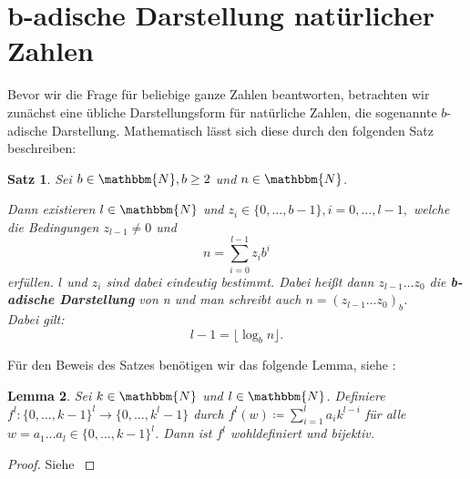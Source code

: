 \documentclass{article}
\newcommand{\N}{\mathbbm{N}} %
\newtheorem{satz}{Satz}
\newtheorem{lemma}[satz]{Lemma}
\begin{document}
\newpage

\section{b-adische Darstellung natürlicher Zahlen}
  Bevor wir die Frage für beliebige ganze Zahlen beantworten, betrachten wir zunächst eine übliche Darstellungsform für natürliche Zahlen, die sogenannte $b$-adische Darstellung.
  Mathematisch lässt sich diese durch den folgenden Satz beschreiben: 

  \begin{satz} \label{satz:b-adische_Darstellung}
    Sei $b\in \N, b \geq 2$ und $n \in \N$. 

    Dann existieren $l \in \N$ und $z_i \in \{0, \dots, b-1\}, {i = 0, \dots, l-1},$ welche die Bedingungen $z_{l-1} \neq 0$ und 
    \begin{equation}
      n = \sum_{i=0}^{l-1}z_ib^i \label{eq:b-adische_Darstellung_n}
    \end{equation}
    erfüllen.
    $l$ und $z_i$ sind dabei eindeutig bestimmt. Dabei heißt dann $z_{l-1}\dots z_0$ die \textbf{b-adische Darstellung} von n und man schreibt auch $n=(z_{l-1} \dots z_0)_b$. \\
    Dabei gilt: 
    \begin{equation}
      l-1 = \lfloor \log_b n \rfloor. \label{eq:b-adische_Darstellung_log}
    \end{equation}
  \end{satz}

  Für den Beweis des Satzes benötigen wir das folgende Lemma, siehe \cite[S.~17,~Lemma~1.19]{hougardy2018}:

    \begin{lemma} \label{lemma:Eindeutigkeit_b-adische_Darstellung}
      Sei $k \in \N$ und $l \in \N$. 
      Definiere $f^l \colon \{0, \dots, k-1\}^l \to \{0, \dots, k^l-1\}$ durch $f^l(w) \coloneq \sum_{i=1}^l a_i k^{l-i}$ für alle $w=a_1 \dots a_l \in \{0, \dots, k-1\}^l$.
      Dann ist $f^l$ wohldefiniert und bijektiv.
    \end{lemma}
      \begin{proof}
        Siehe \cite[S.~17f,~Lemma~1.19]{hougardy2018}
      \end{proof}
    
\end{document}
